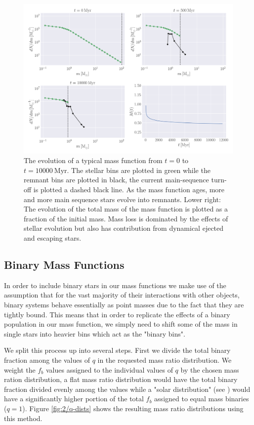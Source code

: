 \begin{figure}
    \centering
    \includegraphics[width=\textwidth]{figures/evolve_mf.png}
    \caption{The evolution of a typical mass function from $t=0$ to $t=10000 \ \mathrm{Myr}$.
        The stellar bins are plotted in green while the remnant bins are plotted in black,
        the current main-sequence turn-off is plotted a dashed black line. As the mass
        function ages, more and more main sequence stars evolve into remnants. Lower right:
        The evolution of the total mass of the mass function is plotted as a fraction of the
        initial mass. Mass loss is dominated by the effects of stellar evolution but also
        has contribution from dynamical ejected and escaping stars.}
    \label{fig:2/evolve_mf}
\end{figure}


\subsection{Binary Mass Functions}

In order to include binary stars in our mass functions we make use of the assumption that for the
vast majority of their interactions with other objects, binary systems behave essentially as point
masses due to the fact that they are tightly bound. This means that in order to replicate the effects
of a binary population in our mass function, we simply need to shift some of the mass in single
stars into heavier bins which act as the "binary bins".


We split this process up into several steps. First we divide the total binary fraction among the
values of $q$ in the requested mass ratio distribution. We weight the $f_b$ values assigned to the
individual values of $q$ by the chosen mass ration distribution, a flat mass ratio distribution
would have the total binary fraction divided evenly among the values while a "solar distribution"
(see \citealt{Fisher2005}) would have a significantly higher portion of the total $f_b$ assigned to
equal mass binaries ($q=1$). Figure \ref{fig:2/q-dists} shows the resulting mass ratio distributions
using this method.


